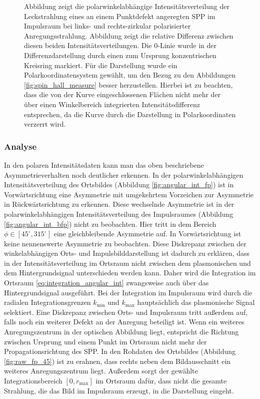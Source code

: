 \documentclass[a4paper, titlepage,  ngerman]{book}
\begin{document}
\begin{figure}
			\caption[Polarwinkel Auswertung Impulsraum]{Abbildung  zeigt die polarwinkelabhängige Intensitätsverteilung der Leckstrahlung eines an einem Punktdefekt angeregten SPP im Impulsraum bei links- und rechts-zirkular polarisierter Anregungsstrahlung. Abbildung  zeigt die relative Differenz zwischen diesen beiden Intensitätsverteilungen. Die $0$-Linie wurde in der Differenzdarstellung durch einen zum Ursprung konzentrischen Kreisring markiert. Für die Darstellung wurde ein Polarkoordinatensystem gewählt, um den Bezug zu den Abbildungen \ref{fig:spin_hall_measure} besser herzustellen. Hierbei ist zu beachten, dass die von der Kurve eingeschlossenen Flächen nicht mehr der über einen Winkelbereich integrierten Intensitätsdifferenz entsprechen, da die Kurve durch die Darstellung in Polarkoordinaten verzerrt wird.}
			\label{fig:angular_dist_bfp}
		\end{figure}
		\subsubsection{Analyse}
		In den polaren Intensitätsdaten kann man das oben beschriebene Asymmetrieverhalten noch deutlicher erkennen. In der polarwinkelabhängigen Intensitätsverteilung des Ortsbildes (Abbildung \ref{fig:angular_int_fp}) ist in Vorwärtsrichtung eine Asymmetrie mit umgekehrtem Vorzeichen zur Asymmetrie in Rückwärtsrichtung zu erkennen. Diese wechselnde Asymmetrie ist in der polarwinkelabhängigen Intensitätsverteilung des Impulsraumes (Abbildung \ref{fig:angular_int_bfp}) nicht zu beobachten. Hier tritt in dem Bereich $\phi \in [45^\circ, 315^\circ]$ eine gleichbleibende Asymmetrie auf. In Vorwärtsrichtung ist keine nennenswerte Asymmetrie zu beobachten. Diese Diskrepanz zwischen der winkelabhängigen Orts- und Impulsbilddarstellung ist dadurch zu erklären, dass in der Intensitätsverteilung im Ortsraum nicht zwischen dem plasmonischen und dem Hintergrundsignal unterschieden werden kann. Daher wird die Integration im Ortsraum \eqref{eq:integration_angular_int} zwangsweise auch über das Hintergrundsignal ausgeführt. Bei der Integration im Impulsraum wird durch die radialen Integrationsgrenzen $k_\mathrm{min}$ und $k_\mathrm{max}$ hauptsächlich das plasmonische Signal selektiert. Eine Diskrepanz zwischen Orts- und Impulsraum tritt außerdem auf, falls noch ein weiterer Defekt an der Anregung beteiligt ist. Wenn ein weiteres Anregungszentrum in der optischen Abbildung liegt, entspricht die Richtung zwischen Ursprung und einem Punkt im Ortsraum nicht mehr der Propagationsrichtung des SPP. In den Rohdaten des Ortsbildes (Abbildung \ref{fig:raw_fp_45}) ist zu erahnen, dass rechts neben dem Bildausschnitt ein weiteres Anregungszentrum liegt. Außerdem sorgt der gewählte Integrationsbereich $[0, r_\mathrm{max}]$ im Ortsraum dafür, dass nicht die gesamte Strahlung, die das Bild im Impulsraum erzeugt, in die Darstellung eingeht.
		
\end{document}
